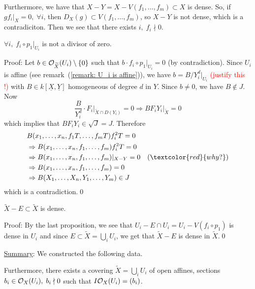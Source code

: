 Furthermore, we have that $X-Y=X-V(f_1,\dots,f_m)\subset X$ is dense. So, if $gf_i|_X=0,\;\forall i$, then 
$D_X(g)\subset V(f_1,\dots,f_m)$, so $X-Y$ is not dense, which is a contradiciton. Then we see that there exists 
$i,\;f_i\nmid0$.

\begin{dang}
\begin{proposition}
    $\forall i,\;f_i\circ p_1|_{U_i}$ is not a divisor of zero.
\end{proposition}
\end{dang}
Proof: Let $b\in\mathcal{O}_{\widetilde{X}}(U_i)\setminus\{0\}$ such that $b\cdot f_i\circ p_1|_{U_i}=0$ (by contradiction). 
Since $U_i$ is affine (see remark~(\ref{remark: U_i is affine})), we have $b=B/Y_i^d|_{U_i}$ 
\textcolor{red}{(justify this !)} with $B\in k[\underline{X},\underline{Y}]$ homogeneous of degree 
$d$ in $Y$. Since $b\neq0$, we have $B\notin J$. Now 
\begin{equation}
    \frac{B}{Y_i^d}\cdot F_i\bigg|_{\widetilde{X}\cap D(Y_i)}=0\Rightarrow BF_iY_i\big|_{\widetilde{X}}=0
\end{equation}
which implies that $BF_iY_i \in \sqrt{J}=J$. Therefore
\begin{equation}
    \begin{split}
        &B(x_1,\dots,x_n, f_1T,\dots, f_mT)f_i^2 T = 0\\
        &\Rightarrow B(x_1,\dots,x_n,f_1,\dots,f_m)f_i^2T = 0\\
        &\Rightarrow B(x_1,\dots, x_n, f_1,\dots, f_m)|_{X-Y}=0\quad(\textcolor{red}{why?})\\
        &\Rightarrow B(x_1,\dots,x_n,f_1,\dots, f_m) = 0\\
        &\Rightarrow B(X_1,\dots, X_n, Y_1,\dots, Y_m)\in J
    \end{split}
\end{equation}
which is a contradiction.\qed
\begin{dang}
    \begin{proposition}
        $\widetilde{X}-E\subset \widetilde{X}$ is dense.
    \end{proposition}
\end{dang}
Proof: By the last proposition, we see that $U_i - E\cap U_i = U_i - V(f_i\circ p_1)$ is dense in $U_i$ and since 
$E\subset \widetilde{X}=\bigcup_i U_i$, we get that $\widetilde{X}-E$ is dense in $\widetilde{X}$.\qed

\underline{Summary}: We constructed the following data. 
\begin{center}
\end{center}
Furthermore, there exists a covering $\widetilde{X}=\bigcup_i U_i$ of open affines, sections 
$b_i\in\mathcal{O}_X(U_i),\;b_i\nmid 0$ such that $I\mathcal{O}_X(U_i)=(b_i)$.
